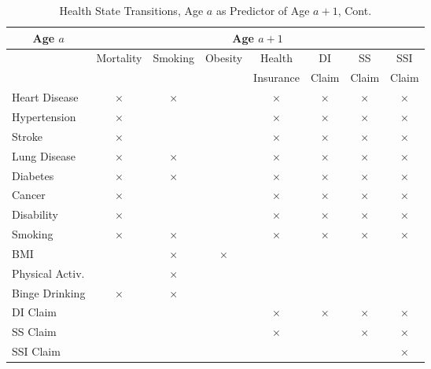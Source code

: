 \documentclass[static]{JJH-Beamer}
\begin{document}
\begin{frame}

\begin{table}[H]
\addtocounter{table}{-1}
\caption{Health State Transitions, Age $a$ as Predictor of Age $a+1$, Cont.}\label{table:transition}
\begin{center}
\begin{tabular}{l|ccccccc} \toprule
\multicolumn{1}{c}{Age $a$} & \multicolumn{7}{c}{Age $a+1$} \\ \midrule
& Mortality & Smoking  & Obesity & Health  & DI  & SS  & SSI  \\
& &  &  & Insurance & Claim & Claim & Claim \\
Heart Disease &$\times$ & $\times$           &       &  $\times$  & $\times$ & $\times$ & $\times$\\
Hypertension  &$\times$ &       &     & $\times$   & $\times$ & $\times$  & $\times$\\
Stroke          &$\times$ &             &      &   $\times$  & $\times$ & $\times$  & $\times$\\
Lung Disease  &$\times$ & $\times$    &        &   $\times$  &$\times$  & $\times$  & $\times$\\
Diabetes      &$\times$ & $\times$            &       &  $\times$    & $\times$& $\times$ & $\times$ \\
Cancer        & $\times$&           &         &   $\times$  & $\times$ & $\times$  & $\times$\\
Disability    &$\times$ &         &      &     $\times$  & $\times$ & $\times$   & $\times$\\
\midrule
Smoking &$\times$ & $\times$   &   &     $\times$  & $\times$ & $\times$   & $\times$\\
BMI   & & $\times$    &  $\times$ &     &  &   & \\
Physical Activ.  & & $\times$    &   &     &   &  & \\
Binge Drinking  &$\times$ & $\times$    &      &      &   &     &  \\
\midrule
DI Claim     & &             &         & $\times$    & $\times$   & $\times$ & $\times$\\
SS Claim     &           &         &     & $\times$ &  & $\times$& $\times$\\
SSI Claim    & &         &        &      & &   & $\times$\\ \bottomrule
\end{tabular}
\end{center}
\end{table}

\end{frame}
\end{document}
